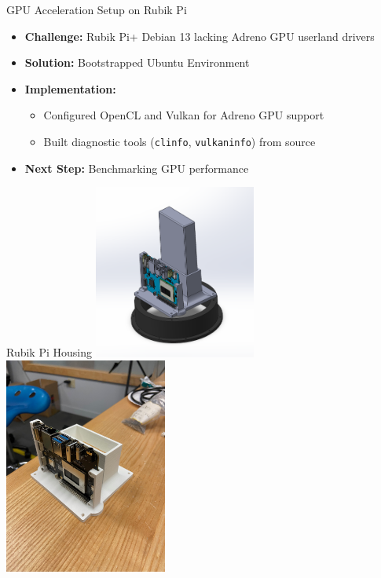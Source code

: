 \begin{frame}{GPU Acceleration Setup on Rubik Pi}
   \begin{itemize}
       \item \textbf{Challenge:} Rubik Pi+ Debian 13 lacking Adreno GPU userland drivers
       \item \textbf{Solution:} Bootstrapped Ubuntu Environment
       \item \textbf{Implementation:}
           \begin{itemize}
               \item Configured OpenCL and Vulkan for Adreno GPU support
               \item Built diagnostic tools (\texttt{clinfo}, \texttt{vulkaninfo}) from source
           \end{itemize}
       \item \textbf{Next Step:} Benchmarking GPU performance
   \end{itemize}
\end{frame}

\begin{frame}{Rubik Pi Housing}
    \centering
    \includegraphics[width=0.4\textwidth,keepaspectratio]{images/rubik_pi_assembly_iso_v1.png}
    \includegraphics[width=0.4\textwidth, keepaspectratio]{images/rubik_pi_in_housing_v1.jpg}
\end{frame}

